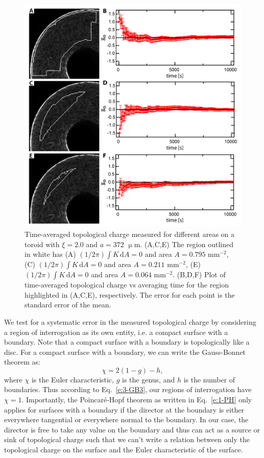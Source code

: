 \begin{figure}
  \centering
  \includegraphics{figures/C3/Ch3-Figs_ChargeOverTime.png}
  \caption{Time-averaged topological charge measured for different areas on a toroid with $\xi = 2.0$ and $a = 372$ $\upmu$m.
  (A,C,E) The region outlined in white has (A) $(1/2 \pi) \int K \, \textrm{d}A = 0$ and area $A = 0.795$ mm$^{-2}$, (C) $(1/2 \pi) \int K \, \textrm{d}A = 0$ and area $A = 0.211$ mm$^{-2}$, (E) $(1/2 \pi) \int K \, \textrm{d}A = 0$ and area $A = 0.064$ mm$^{-2}$.
  (B,D,F) Plot of time-averaged topological charge vs averaging time for the region highlighted in (A,C,E), respectively.
  The error for each point is the standard error of the mean.
  }\label{f:3-ChargeOverTime}
\end{figure}

We test for a systematic error in the measured topological charge by considering a region of interrogation as its own entity, i.e. a compact surface with a boundary.
Note that a compact surface with a boundary is topologically like a disc.
For a compact surface with a boundary, we can write the Gauss-Bonnet theorem as:
\begin{equation}
  \chi = 2(1-g)-h,\label{e:3-GB3}
\end{equation}
where $\chi$ is the Euler characteristic, $g$ is the genus, and $h$ is the number of boundaries.
Thus according to Eq.~\ref{e:3-GB3}, our regions of interrogation have $\chi = 1$.
Importantly, the Poincar\'e-Hopf theorem as written in Eq.~\ref{e:1-PH} only applies for surfaces with a boundary if the director at the boundary is either everywhere tangential or everywhere normal to the boundary.
In our case, the director is free to take any value on the boundary and thus can act as a source or sink of topological charge such that we can't write a relation between only the topological charge on the surface and the Euler characteristic of the surface.

